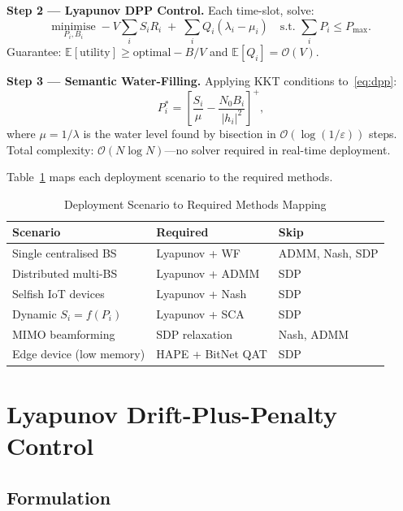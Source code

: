 \documentclass[conference]{IEEEtran}
\begin{document}
\textbf{Step 2 --- Lyapunov DPP Control.}
Each time-slot, solve:
\begin{equation}
\underset{P_i,B_i}{\text{minimise}}\;
-V\sum_i S_i R_i \;+\; \sum_i Q_i(\lambda_i - \mu_i)
\quad \text{s.t. } \sum_i P_i \le P_{\max}.
\label{eq:dpp}
\end{equation}
Guarantee: $\mathbb{E}[\text{utility}] \ge \text{optimal} - B/V$ and $\mathbb{E}[Q_i] = \mathcal{O}(V)$.

\textbf{Step 3 --- Semantic Water-Filling.}
Applying KKT conditions to~\eqref{eq:dpp}:
\begin{equation}
P_i^* = \left[\frac{S_i}{\mu} - \frac{N_0 B_i}{|h_i|^2}\right]^+,
\label{eq:waterfill}
\end{equation}
where $\mu = 1/\lambda$ is the water level found by bisection in $\mathcal{O}(\log(1/\varepsilon))$ steps. Total complexity: $\mathcal{O}(N\log N)$---no solver required in real-time deployment.

Table~\ref{tab:scenario} maps each deployment scenario to the required methods.

\begin{table}[!t]
\renewcommand{\arraystretch}{1.2}
\caption{Deployment Scenario to Required Methods Mapping}
\label{tab:scenario}
\centering
\begin{tabular}{@{}p{3.0cm} p{2.2cm} p{1.6cm}@{}}
\toprule
\textbf{Scenario} & \textbf{Required} & \textbf{Skip} \\
\midrule
Single centralised BS         & Lyapunov + WF              & ADMM, Nash, SDP \\
Distributed multi-BS          & Lyapunov + ADMM            & SDP \\
Selfish IoT devices           & Lyapunov + Nash            & SDP \\
Dynamic $S_i = f(P_i)$        & Lyapunov + SCA             & SDP \\
MIMO beamforming              & SDP relaxation             & Nash, ADMM \\
Edge device (low memory)      & HAPE + BitNet QAT          & SDP \\
\bottomrule
\end{tabular}
\end{table}

\section{Lyapunov Drift-Plus-Penalty Control}
\label{sec:lyapunov}

\subsection{Formulation}
\end{document}
